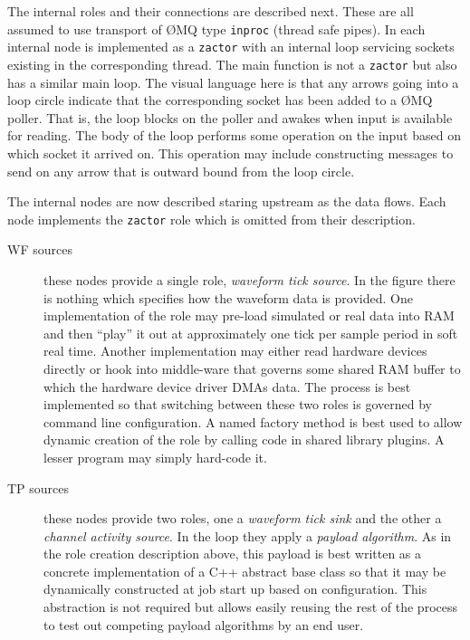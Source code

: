 \documentclass[letterpaper,oneside]{memoir}
\def\zactor{\texttt{zactor}\xspace}
\def\zmq{\O{}MQ\xspace}
\begin{document}
The internal roles and their connections are described next. 
These are all assumed to use transport of \zmq type \texttt{inproc} (thread safe pipes). 
In each internal node is implemented as a \zactor with an internal loop servicing sockets existing in the corresponding thread. 
The main function is not a \zactor but also has a similar main loop. 
The visual language here is that any arrows going into a loop circle indicate that the corresponding socket has been added to a \zmq poller. 
That is, the loop blocks on the poller and awakes when input is available for reading. 
The body of the loop performs some operation on the input based on which socket it arrived on. 
This operation may include constructing messages to send on any arrow that is outward bound from the loop circle.

The internal nodes are now described staring upstream as the data flows.  Each node implements the \zactor role which is omitted from their description.

\begin{description}
\item[WF sources] these nodes provide a single role, \textit{waveform tick source}. 
  In the figure there is nothing which specifies how the waveform data is provided. 
  One implementation of the role may pre-load simulated or real data into RAM and then ``play'' it out at approximately one tick per sample period in soft real time. 
  Another implementation may either read hardware devices directly or hook into middle-ware that governs some shared RAM buffer to which the hardware device driver DMAs data. 
  The process is best implemented so that switching between these two roles is governed by command line configuration. 
  A named factory method is best used to allow dynamic creation of the role by calling code in shared library plugins. 
  A lesser program may simply hard-code it.

\item[TP sources] these nodes provide two roles, one a \textit{waveform tick sink} and the other a \textit{channel activity source}. 
  In the loop they apply a \textit{payload algorithm}. 
  As in the role creation description above, this payload is best written as a concrete implementation of a C++ abstract base class so that it may be dynamically constructed at job start up based on configuration. 
  This abstraction is not required but allows easily reusing the rest of the process to test out competing payload algorithms by an end user.

\end{description}
\end{document}
